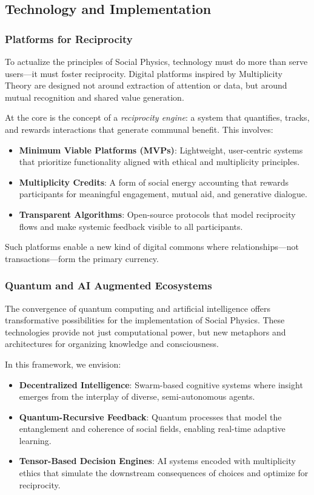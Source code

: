 \documentclass{article}
\theoremstyle{plain}
\theoremstyle{claimstyle}
\begin{document}
\subsection{Technology and Implementation}

\subsubsection{Platforms for Reciprocity}

To actualize the principles of Social Physics, technology must do more than serve users—it must foster reciprocity. Digital platforms inspired by Multiplicity Theory are designed not around extraction of attention or data, but around mutual recognition and shared value generation.

At the core is the concept of a \textit{reciprocity engine}: a system that quantifies, tracks, and rewards interactions that generate communal benefit. This involves:

\begin{itemize}
    \item \textbf{Minimum Viable Platforms (MVPs)}: Lightweight, user-centric systems that prioritize functionality aligned with ethical and multiplicity principles.
    \item \textbf{Multiplicity Credits}: A form of social energy accounting that rewards participants for meaningful engagement, mutual aid, and generative dialogue.
    \item \textbf{Transparent Algorithms}: Open-source protocols that model reciprocity flows and make systemic feedback visible to all participants.
\end{itemize}

Such platforms enable a new kind of digital commons where relationships—not transactions—form the primary currency.

\subsubsection{Quantum and AI Augmented Ecosystems}

The convergence of quantum computing and artificial intelligence offers transformative possibilities for the implementation of Social Physics. These technologies provide not just computational power, but new metaphors and architectures for organizing knowledge and consciousness.

In this framework, we envision:

\begin{itemize}
    \item \textbf{Decentralized Intelligence}: Swarm-based cognitive systems where insight emerges from the interplay of diverse, semi-autonomous agents.
    \item \textbf{Quantum-Recursive Feedback}: Quantum processes that model the entanglement and coherence of social fields, enabling real-time adaptive learning.
    \item \textbf{Tensor-Based Decision Engines}: AI systems encoded with multiplicity ethics that simulate the downstream consequences of choices and optimize for reciprocity.
\end{itemize}
\end{document}
